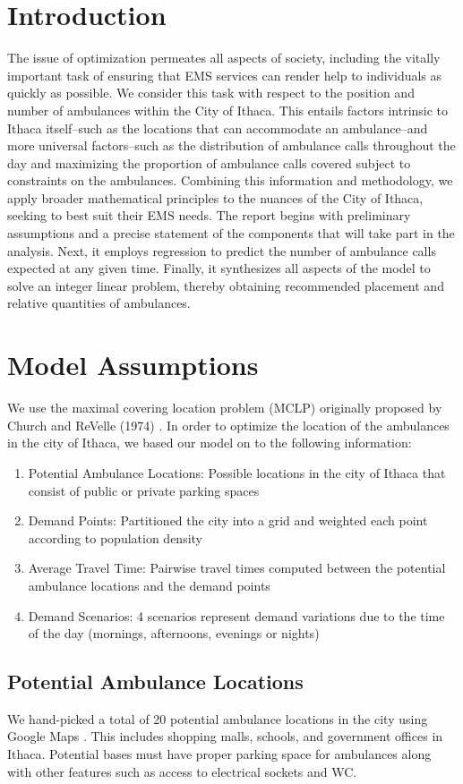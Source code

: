 \documentclass{article}
\begin{document}
\section{Introduction}
The issue of optimization permeates all aspects of society, including the vitally important task of ensuring that EMS services can render help to individuals as quickly as possible. We consider this task with respect to the position and number of ambulances within the City of Ithaca. This entails factors intrinsic to Ithaca itself--such as the locations that can accommodate an ambulance--and more universal factors--such as the distribution of ambulance calls throughout the day and maximizing the proportion of ambulance calls covered subject to constraints on the ambulances. Combining this information and methodology, we apply broader mathematical principles to the nuances of the City of Ithaca, seeking to best suit their EMS needs. The report begins with preliminary assumptions and a precise statement of the components that will take part in the analysis. Next, it employs regression to predict the number of ambulance calls expected at any given time. Finally, it synthesizes all aspects of the model to solve an integer linear problem, thereby obtaining recommended placement and relative quantities of ambulances.      

\section{Model Assumptions}
We use the maximal covering location problem (MCLP) originally proposed
by Church and ReVelle (1974) \cite{church1974maximal}. In order to optimize the location of the ambulances in the city of Ithaca, we based our model on to the following
information:
\begin{enumerate}
    \item{Potential Ambulance Locations:}  Possible locations in the city of Ithaca that consist of public or private parking spaces
    \item{Demand Points:} Partitioned the city into a grid and weighted each point according to population density
    \item{Average Travel Time:} Pairwise travel times computed between the potential ambulance locations and the demand points
    \item{Demand Scenarios:} 4 scenarios represent demand variations due to the time of the day (mornings, afternoons, evenings or nights)
\end{enumerate}
\subsection{Potential Ambulance Locations}
We hand-picked a total of 20 potential ambulance locations in the city
using Google Maps \cite{google}. This includes shopping malls, schools, and government offices in Ithaca. Potential bases must have proper parking space for ambulances along with other features such as access to electrical sockets and WC.
\end{document}
